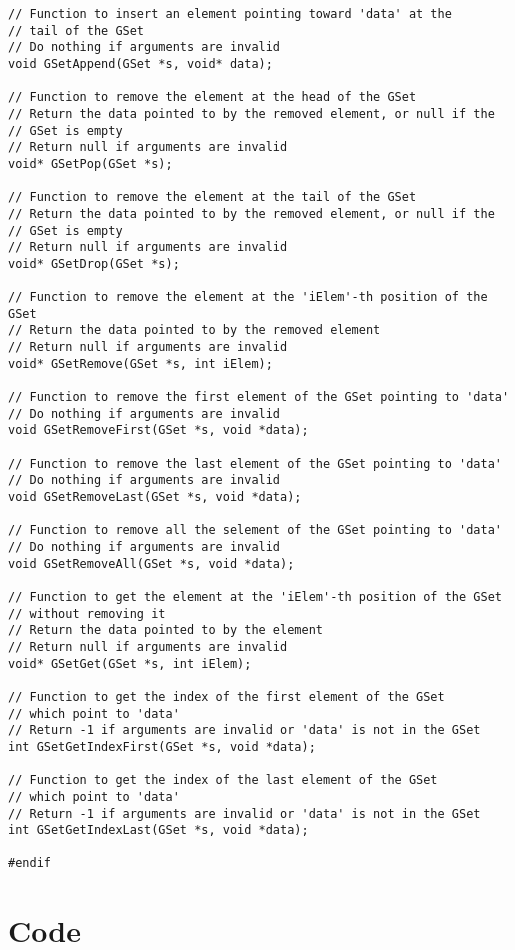 \documentclass[12pt, a4paper]{article}
\begin{document}
\begin{scriptsize}
\begin{ttfamily}
\begin{lstlisting}
// Function to insert an element pointing toward 'data' at the 
// tail of the GSet
// Do nothing if arguments are invalid
void GSetAppend(GSet *s, void* data);

// Function to remove the element at the head of the GSet
// Return the data pointed to by the removed element, or null if the 
// GSet is empty
// Return null if arguments are invalid
void* GSetPop(GSet *s);

// Function to remove the element at the tail of the GSet
// Return the data pointed to by the removed element, or null if the 
// GSet is empty
// Return null if arguments are invalid
void* GSetDrop(GSet *s);

// Function to remove the element at the 'iElem'-th position of the GSet
// Return the data pointed to by the removed element
// Return null if arguments are invalid
void* GSetRemove(GSet *s, int iElem);

// Function to remove the first element of the GSet pointing to 'data'
// Do nothing if arguments are invalid
void GSetRemoveFirst(GSet *s, void *data);

// Function to remove the last element of the GSet pointing to 'data'
// Do nothing if arguments are invalid
void GSetRemoveLast(GSet *s, void *data);

// Function to remove all the selement of the GSet pointing to 'data'
// Do nothing if arguments are invalid
void GSetRemoveAll(GSet *s, void *data);

// Function to get the element at the 'iElem'-th position of the GSet
// without removing it
// Return the data pointed to by the element
// Return null if arguments are invalid
void* GSetGet(GSet *s, int iElem);

// Function to get the index of the first element of the GSet
// which point to 'data'
// Return -1 if arguments are invalid or 'data' is not in the GSet
int GSetGetIndexFirst(GSet *s, void *data);

// Function to get the index of the last element of the GSet
// which point to 'data'
// Return -1 if arguments are invalid or 'data' is not in the GSet
int GSetGetIndexLast(GSet *s, void *data);

#endif
\end{lstlisting}
\end{ttfamily}
\end{scriptsize}

\section{Code}
\end{document}
